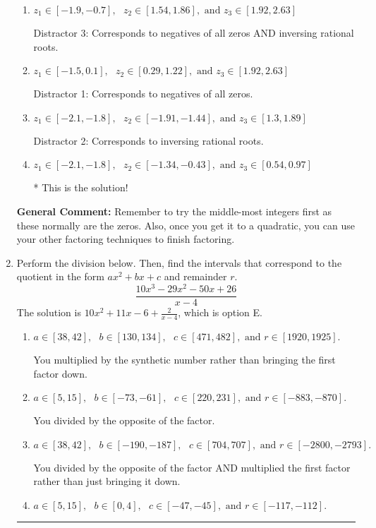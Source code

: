 \documentclass{extbook}[14pt]
\newcommand{\litem}[1]{\item #1

\rule{\textwidth}{0.4pt}}
\begin{document}
\begin{enumerate}
{\begin{enumerate}[label=\Alph*.]
 Distractor 4: Corresponds to moving factors from one rational to another.
\item \( z_1 \in [-1.9, -0.7], \text{   }  z_2 \in [1.54, 1.86], \text{   and   } z_3 \in [1.92, 2.63] \)

 Distractor 3: Corresponds to negatives of all zeros AND inversing rational roots.
\item \( z_1 \in [-1.5, 0.1], \text{   }  z_2 \in [0.29, 1.22], \text{   and   } z_3 \in [1.92, 2.63] \)

 Distractor 1: Corresponds to negatives of all zeros.
\item \( z_1 \in [-2.1, -1.8], \text{   }  z_2 \in [-1.91, -1.44], \text{   and   } z_3 \in [1.3, 1.89] \)

 Distractor 2: Corresponds to inversing rational roots.
\item \( z_1 \in [-2.1, -1.8], \text{   }  z_2 \in [-1.34, -0.43], \text{   and   } z_3 \in [0.54, 0.97] \)

* This is the solution!
\end{enumerate}

\textbf{General Comment:} Remember to try the middle-most integers first as these normally are the zeros. Also, once you get it to a quadratic, you can use your other factoring techniques to finish factoring.
}
\litem{
Perform the division below. Then, find the intervals that correspond to the quotient in the form $ax^2+bx+c$ and remainder $r$.
\[ \frac{10x^{3} -29 x^{2} -50 x + 26}{x -4} \]The solution is \( 10x^{2} +11 x -6 + \frac{2}{x -4} \), which is option E.\begin{enumerate}[label=\Alph*.]
\item \( a \in [38, 42], \text{   } b \in [130, 134], \text{   } c \in [471, 482], \text{   and   } r \in [1920, 1925]. \)

 You multiplied by the synthetic number rather than bringing the first factor down.
\item \( a \in [5, 15], \text{   } b \in [-73, -61], \text{   } c \in [220, 231], \text{   and   } r \in [-883, -870]. \)

 You divided by the opposite of the factor.
\item \( a \in [38, 42], \text{   } b \in [-190, -187], \text{   } c \in [704, 707], \text{   and   } r \in [-2800, -2793]. \)

 You divided by the opposite of the factor AND multiplied the first factor rather than just bringing it down.
\item \( a \in [5, 15], \text{   } b \in [0, 4], \text{   } c \in [-47, -45], \text{   and   } r \in [-117, -112]. \)


\end{enumerate}}
\end{enumerate}
\end{document}

